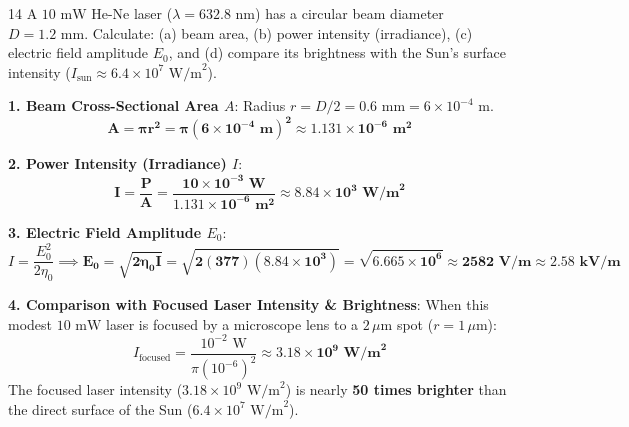 \begin{theoryq}{14}
A $10\text{ mW}$ He-Ne laser ($\lambda = 632.8\text{ nm}$) has a circular beam diameter $D = 1.2\text{ mm}$. Calculate: (a) beam area, (b) power intensity (irradiance), (c) electric field amplitude $E_0$, and (d) compare its brightness with the Sun's surface intensity ($I_{\text{sun}} \approx 6.4 \times 10^7\text{ W/m}^2$).
\end{theoryq}
\begin{theorysol}
\textbf{1. Beam Cross-Sectional Area $A$}:
Radius $r = D/2 = 0.6\text{ mm} = 6 \times 10^{-4}\text{ m}$.
\begin{equation}
\mathbf{A = \pi r^2 = \pi (6 \times 10^{-4}\text{ m})^2 \approx 1.131 \times 10^{-6}\text{ m}^2}
\end{equation}

\textbf{2. Power Intensity (Irradiance) $I$}:
\begin{equation}
\mathbf{I = \frac{P}{A} = \frac{10 \times 10^{-3}\text{ W}}{1.131 \times 10^{-6}\text{ m}^2} \approx 8.84 \times 10^3\text{ W/m}^2}
\end{equation}

\textbf{3. Electric Field Amplitude $E_0$}:
\begin{equation}
I = \frac{E_0^2}{2\eta_0} \implies \mathbf{E_0 = \sqrt{2 \eta_0 I} = \sqrt{2(377)(8.84 \times 10^3)} = \sqrt{6.665 \times 10^6} \approx 2582\text{ V/m} \approx 2.58\text{ kV/m}}
\end{equation}

\textbf{4. Comparison with Focused Laser Intensity \& Brightness}:
When this modest $10\text{ mW}$ laser is focused by a microscope lens to a $2\,\mu\text{m}$ spot ($r = 1\,\mu\text{m}$):
\begin{equation}
I_{\text{focused}} = \frac{10^{-2}\text{ W}}{\pi (10^{-6})^2} \approx \mathbf{3.18 \times 10^9\text{ W/m}^2}
\end{equation}
The focused laser intensity ($3.18 \times 10^9\text{ W/m}^2$) is nearly \textbf{50 times brighter} than the direct surface of the Sun ($6.4 \times 10^7\text{ W/m}^2$).
\end{theorysol}
\vspace{4mm}

